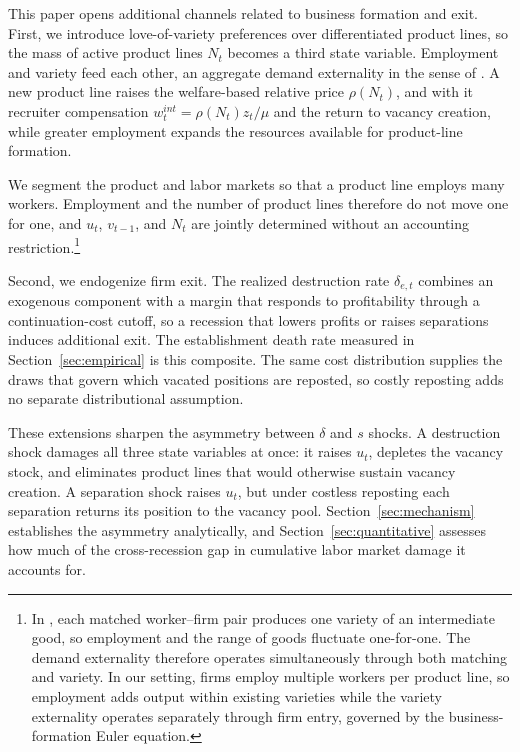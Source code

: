 \documentclass[authoryear, review, 12pt]{elsarticle}
\begin{document}
	This paper opens additional channels related to business formation and exit. First, we
	introduce love-of-variety preferences over differentiated product lines, so the mass of
	active product lines $N_t$ becomes a third state variable. Employment and variety feed each
	other, an aggregate demand externality in the sense of \citet{schaal_2019}. A new product
	line raises the welfare-based relative price $\rho(N_t)$, and with it recruiter compensation
	$w^{int}_t=\rho(N_t)z_t/\mu$ and the return to vacancy creation, while greater employment
	expands the resources available for product-line formation.

	We segment the product and labor markets so that a product line employs many workers.
	Employment and the number of product lines therefore do not move one for one, and $u_t$,
	$v_{t-1}$, and $N_t$ are jointly determined without an accounting restriction.\footnote{In \citet{schaal_2019}, each matched
		worker--firm pair produces one variety of an intermediate good,
		so employment and the range of goods fluctuate one-for-one. The
		demand externality therefore operates simultaneously through both
		matching and variety. In our setting, firms employ multiple
		workers per product line, so employment adds output within
		existing varieties while the variety externality operates
		separately through firm entry, governed by the business-formation
		Euler equation.}

	Second, we endogenize firm exit. The realized destruction rate $\delta_{e,t}$ combines an
	exogenous component with a margin that responds to profitability through a
	continuation-cost cutoff, so a recession that lowers profits or raises separations induces
	additional exit. The establishment death rate measured in Section~\ref{sec:empirical} is
	this composite. The same cost distribution supplies the draws that govern which vacated
	positions are reposted, so costly reposting adds no separate distributional assumption.

	These extensions sharpen the asymmetry between $\delta$ and $s$ shocks. A destruction
	shock damages all three state variables at once: it raises $u_t$, depletes the vacancy
	stock, and eliminates product lines that would otherwise sustain vacancy creation. A
	separation shock raises $u_t$, but under costless reposting each separation returns its
	position to the vacancy pool. Section~\ref{sec:mechanism} establishes the asymmetry
	analytically, and Section~\ref{sec:quantitative} assesses how much of the cross-recession
	gap in cumulative labor market damage it accounts for.
\end{document}
